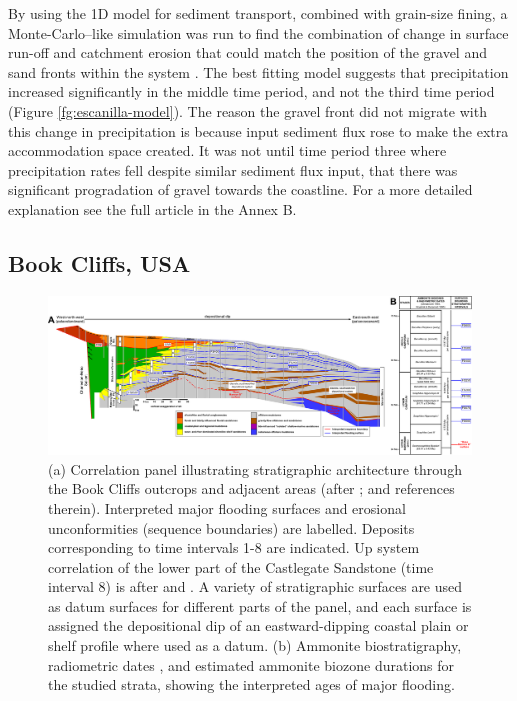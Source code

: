 By using the 1D model for sediment transport, combined with grain-size fining, a Monte-Carlo--like simulation was run to find the combination of change in surface run-off and catchment erosion that could match the position of the gravel and sand fronts within the system \citep{armitage-etal-2015}. The best fitting model suggests that precipitation increased significantly in the middle time period, and not the third time period (Figure \ref{fg:escanilla-model}). The reason the gravel front did not migrate with this change in precipitation is because input sediment flux rose to make the extra accommodation space created. It was not until time period three where precipitation rates fell despite similar sediment flux input, that there was significant progradation of gravel towards the coastline. For a more detailed explanation see the full article in the Annex B.

\subsection{Book Cliffs, USA}

\begin{figure}
\includegraphics[width=\textwidth]{./figures/ch2-bookcliffs.pdf}
\caption{(a) Correlation panel illustrating stratigraphic architecture through the Book Cliffs outcrops and adjacent areas (after \citealp{horton-etal-2004,hampson-2010,hampson-etal-2014}; and references therein). Interpreted major flooding surfaces and erosional unconformities (sequence boundaries) are labelled. Deposits corresponding to time intervals 1-8 are indicated. Up system correlation of the lower part of the Castlegate Sandstone (time interval 8) is after \cite{robinson-1998} and \cite{mclaurin-2000}. A variety of stratigraphic surfaces are used as datum surfaces for different parts of the panel, and each surface is assigned the depositional dip of an eastward-dipping coastal plain or shelf profile where used as a datum. (b) Ammonite biostratigraphy, radiometric dates \citep{obradovich-1993}, and estimated ammonite biozone durations \citep{krystinik-1995} for the studied strata, showing the interpreted ages of major flooding.}
\label{fg:bookcliffs}
\end{figure}


